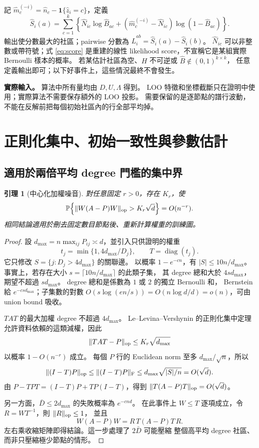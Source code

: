 \documentclass[11pt,a4paper]{article}
\theoremstyle{zhplain}
\newtheorem{lemma}[theorem]{引理}
\numberwithin{equation}{section}
\newcommand{\PP}{\mathbb P}
\newcommand{\one}{\mathbf 1}
\newcommand{\diag}{\operatorname{diag}}
\newcommand{\op}{\mathrm{op}}
\newcommand{\Frob}{\mathrm{F}}
\DeclarePairedDelimiter{\norm}{\lVert}{\rVert}
\begin{document}
記 \(\hat m_c^{(-i)}=\hat n_c-\one\{\hat z_i=c\}\)，定義
\begin{equation}
 \widehat S_i(a)=
 \sum_{c=1}^k
 \left\{\hat N_{ic}\log\hat B_{ac}
 +(\hat m_c^{(-i)}-\hat N_{ic})\log(1-\hat B_{ac})\right\}.
 \label{eq:score}
\end{equation}
輸出使分數最大的社區；pairwise 分數為
\(\widehat L_i^{ab}=\widehat S_i(a)-\widehat S_i(b)\)。
\(\hat N_{ic}\) 可以非整數或帶符號；式 \eqref{eq:score}
是重建的線性 likelihood score，不宣稱它是某組實際 Bernoulli 樣本的概率。
若某估計社區為空、\(\hat H\) 不可逆或 \(\hat B\notin(0,1)^{k\times k}\)，
任意定義輸出即可；以下好事件上，這些情況最終不會發生。

\begin{resultbox}
\textbf{實際輸入。}
算法中所有量均由 \(D,U,\Lambda\) 得到。
LOO 特徵和坐標截斷只在證明中使用；實際算法不需要保存額外的 LOO 投影。
需要保留的是逐節點的譜行波動，不能在反解前把每個初始社區內的行全部平均掉。
\end{resultbox}

\section{正則化集中、初始一致性與參數估計}
\label{sec:concentration}

\subsection{適用於兩倍平均 degree 門檻的集中界}
\begin{lemma}[中心化加權噪音]
\label{lem:noise}
對任意固定 \(r>0\)，存在 \(K_r\)，使
\[
 \PP\!\left\{\norm{W(A-P)W}_{\op}>K_r\sqrt d\right\}
 =O(n^{-r}).
\]
相同結論適用於刪去固定數目節點後、重新計算權重的訓練圖。
\end{lemma}
\begin{proof}
設 \(d_{\max}=n\max_{ij}P_{ij}\asymp d\)，並引入只供證明的權重
\[
 t_j=\min\{1,4d_{\max}/D_j\},\qquad T=\diag(t_j).
\]
它只修改 \(S=\{j:D_j>4d_{\max}\}\) 的關聯邊。
以概率 \(1-e^{-cn}\)，有 \(|S|\le10n/d_{\max}\)。
事實上，若存在大小 \(s=\lceil10n/d_{\max}\rceil\) 的此類子集，
其 degree 總和大於 \(4sd_{\max}\)，期望不超過 \(sd_{\max}\)。
degree 總和是係數為 \(1\) 或 \(2\) 的獨立 Bernoulli 和，
Bernstein 給 \(e^{-csd_{\max}}\)；子集數的對數
\(O(s\log(en/s))=O(n\log d/d)=o(n)\)，可由 union bound 吸收。

\(TAT\) 的最大加權 degree 不超過 \(4d_{\max}\)。
Le--Levina--Vershynin 的正則化集中定理 \cite[Theorem 2.1]{LLV}
允許資料依賴的這類減權，因此
\[
 \norm{TAT-P}_{\op}\le K_r\sqrt{d_{\max}}
\]
以概率 \(1-O(n^{-r})\) 成立。
每個 \(P\) 行的 Euclidean norm 至多 \(d_{\max}/\sqrt n\)，所以
\[
 \norm{(I-T)P}_{\op}
 \le \norm{(I-T)P}_{\Frob}
 \le d_{\max}\sqrt{|S|/n}=O(\sqrt d).
\]
由
\(P-TPT=(I-T)P+TP(I-T)\)，得到
\(\norm{T(A-P)T}_{\op}=O(\sqrt d)\)。

另一方面，\(\bar D\le2d_{\max}\) 的失敗概率為 \(e^{-cnd}\)。
在此事件上 \(W\le T\) 逐項成立，令 \(R=WT^{-1}\)，則 \(\norm R_{\op}\le1\)，
並且
\[
 W(A-P)W=R\,T(A-P)T\,R.
\]
左右乘收縮矩陣即得結論。這一步處理了 \(2\bar D\) 可能壓縮
整個高平均 degree 社區、而非只壓縮極少節點的情形。
\end{proof}
\end{document}
